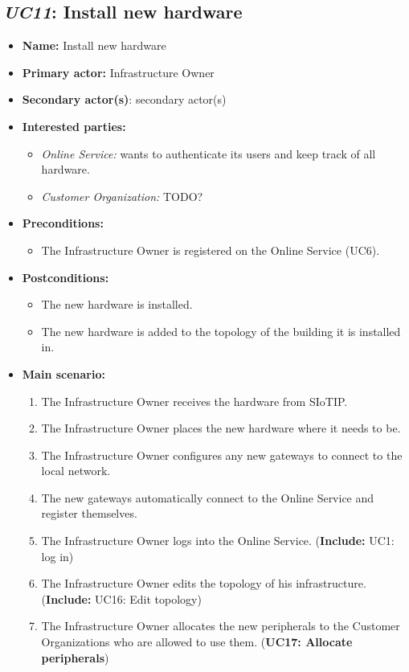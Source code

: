 \documentclass[english]{sareport}
\begin{document}
\subsection{\emph{UC11}: Install new hardware}
\begin{itemize}
    \item \textbf{Name:} Install new hardware
    \item \textbf{Primary actor:} Infrastructure Owner
    \item \textbf{Secondary actor(s)}: secondary actor(s)
    \item \textbf{Interested parties:} 
        \begin{itemize}
            \item \textit{Online Service:}  wants to authenticate its users and keep track of all hardware.
            \item \textit{Customer Organization:} TODO?
        \end{itemize}

    \item \textbf{Preconditions:}
        \begin{itemize}
            \item The Infrastructure Owner is registered on the Online Service (UC6).
        \end{itemize}

    \item \textbf{Postconditions:}
        \begin{itemize}
            \item The new hardware is installed.
            \item The new hardware is added to the topology of the building it is installed in.
        \end{itemize}
        
    \item \textbf{Main scenario:} 
    \begin{enumerate}
       \item The Infrastructure Owner receives the hardware from SIoTIP.
       \item The Infrastructure Owner places the new hardware where it needs to be.
       \item The Infrastructure Owner configures any new gateways to connect to the local network.
       \item The new gateways automatically connect to the Online Service and register themselves.
       \item The Infrastructure Owner logs into the Online Service. (\textbf{Include:} UC1: log in)
       \item The Infrastructure Owner edits the topology of his infrastructure. (\textbf{Include:} UC16: Edit topology)
       \item The Infrastructure Owner allocates the new peripherals to the Customer Organizations who are allowed to use them. (\textbf{UC17: Allocate peripherals})
    \end{enumerate}
\end{itemize}
\end{document}
